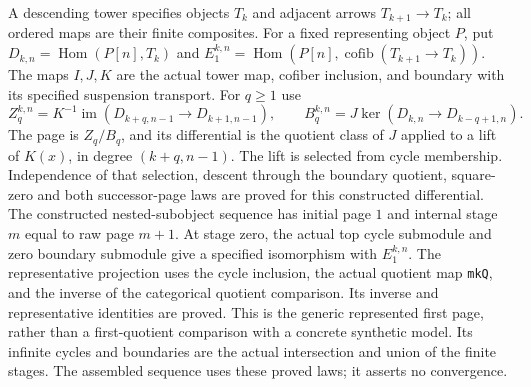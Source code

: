 \begin{definition}
  \label{def:represented-tower-sequence}
  \leanok
  A descending tower specifies objects $T_k$ and adjacent arrows
  $T_{k+1}\to T_k$; all ordered maps are their finite composites.
  For a fixed representing object $P$, put
  $D_{k,n}=\operatorname{Hom}(P[n],T_k)$ and
  $E_1^{k,n}=\operatorname{Hom}(P[n],\operatorname{cofib}(T_{k+1}\to T_k))$.
  The maps $I,J,K$ are the actual tower map, cofiber inclusion, and boundary
  with its specified suspension transport. For $q\ge1$ use
  \[
    Z_q^{k,n}=K^{-1}\operatorname{im}(D_{k+q,n-1}\to D_{k+1,n-1}),
    \qquad
    B_q^{k,n}=J\ker(D_{k,n}\to D_{k-q+1,n}).
  \]
  The page is $Z_q/B_q$, and its differential is the quotient class of
  $J$ applied to a lift of $K(x)$, in degree $(k+q,n-1)$.
  The lift is selected from cycle membership. Independence of that
  selection, descent through the boundary quotient, square-zero and both
  successor-page laws are proved for this constructed differential.
  The constructed nested-subobject sequence has initial page $1$ and internal
  stage $m$ equal to raw page $m+1$. At stage zero, the actual top cycle
  submodule and zero boundary submodule give a specified isomorphism with
  $E_1^{k,n}$. The representative projection uses the cycle inclusion,
  the actual quotient map \texttt{mkQ}, and the inverse of the categorical
  quotient comparison. Its inverse and representative identities are
  proved. This is the generic represented first page, rather than a
  first-quotient comparison with a concrete synthetic model.
  Its infinite cycles and boundaries are
  the actual intersection and union of the finite stages. The assembled
  sequence uses these proved laws; it asserts no convergence.
\end{definition}

